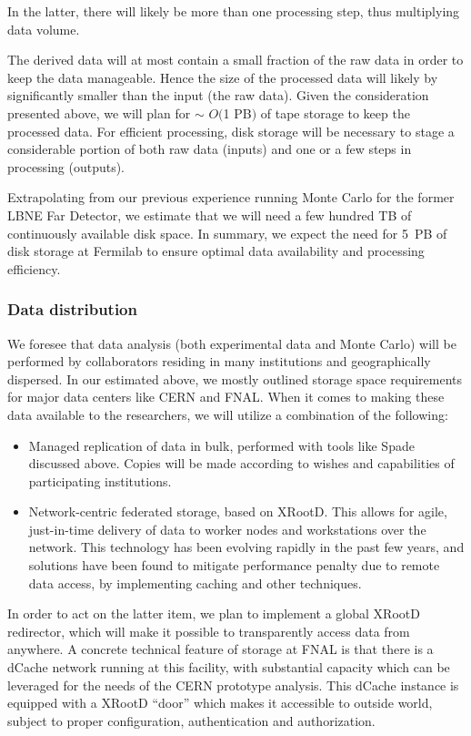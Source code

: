 In the latter, there will likely be more than one processing step, thus multiplying data volume. 

The derived data will at most contain a small fraction of the raw data in order to keep the data manageable.
Hence the size of the processed data will likely by significantly smaller than the input (the raw data). 
Given the consideration presented above, we will plan for
$\sim$ $O($1 PB$)$ of tape storage to keep the processed data. 
For efficient processing, disk storage will be necessary
to stage a considerable portion of both raw data (inputs) and one or a few steps in processing (outputs).

Extrapolating from our previous experience running Monte Carlo for the former LBNE Far Detector, we estimate that we will need a few hundred TB of continuously available
disk space. In summary, we expect the need for 5~PB of disk storage at Fermilab to ensure optimal data availability and 
processing efficiency. 

\subsubsection{Data distribution}
We foresee that data analysis (both experimental data and Monte Carlo) will be performed by collaborators residing in many 
institutions and geographically dispersed. In our
estimated above, we mostly outlined storage space requirements for major data centers like CERN and FNAL. When it comes to making these data available to the researchers,
we will utilize a combination of the following:
\begin{itemize}
\item Managed replication of data in bulk, performed with tools like Spade discussed above. Copies will be made according to wishes and capabilities of participating institutions.
\item Network-centric federated storage, based on XRootD. This allows for agile, just-in-time delivery of data to worker nodes and workstations over the network. This
technology has been evolving rapidly in the past few years, and solutions have been found to mitigate performance penalty due to remote data access, by implementing caching
and other techniques.
\end{itemize}

In order to act on the latter item, we plan to implement a global XRootD redirector, which will make it possible to transparently access data from anywhere.
A concrete technical feature of storage at FNAL is that there is a dCache network running at this facility, with substantial capacity which can be leveraged
for the needs of the CERN prototype analysis. This dCache instance is equipped with a XRootD ``door'' which makes it accessible to outside world, subject
to proper configuration, authentication and authorization.


